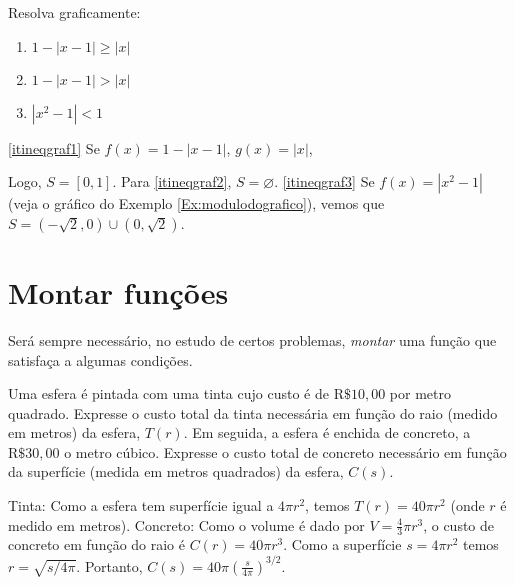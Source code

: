 \begin{exo}
 Resolva graficamente: 
\begin{multicols}{3}
\begin{enumerate}
\item\label{itineqgraf1}  $1-|x-1|\geq |x|$
\item\label{itineqgraf2}  $1-|x-1|> |x|$
\item\label{itineqgraf3}  $|x^2-1|<1$
\end{enumerate}
\end{multicols}
\vspace{0.01cm}
\begin{sol} \eqref{itineqgraf1} Se $f(x)=1-|x-1|$, $g(x)=|x|$,
\begin{center}
\begin{bmlimage}\end{bmlimage}
\end{center}
Logo, $S=[0,1]$. Para \eqref{itineqgraf2}, $S=\varnothing$.
\eqref{itineqgraf3} Se $f(x)=|x^2-1|$ (veja o gráfico do Exemplo
\ref{Ex:modulodografico}), vemos que $S=(-\sqrt{2},0)\cup(0,\sqrt{2})$.
\end{sol}
\end{exo}

\section{Montar funções}

Será sempre necessário, no estudo de certos problemas, \emph{montar} uma função que
satisfaça a algumas condições.

\begin{exo}
 Uma esfera é pintada com uma tinta cujo custo é de $\mathrm{R}\$10,00$ por
metro quadrado. 
Expresse o custo total da tinta necessária em função do raio (medido em metros) da
esfera, $T(r)$.
Em seguida, a esfera é enchida de concreto, a $\mathrm{R}\$30,00$ o metro cúbico. Expresse
o 
custo total de concreto necessário em função da superfície (medida em metros quadrados)
da esfera, $C(s)$.
\begin{sol}
Tinta: Como a esfera tem superfície igual a $4\pi r^2$, temos $T(r)=40\pi r^2$ 
(onde $r$ é medido em metros).
Concreto: Como o volume é dado por $V=\tfrac43\pi r^3$, o custo de concreto em 
função do raio é $C(r)=40\pi r^3$. Como a superfície $s=4\pi r^2$ temos 
$r=\sqrt{s/4\pi}$. Portanto, 
$C(s)=40\pi(\tfrac{s}{4\pi})^{3/2}$.
\end{sol}
\end{exo}


